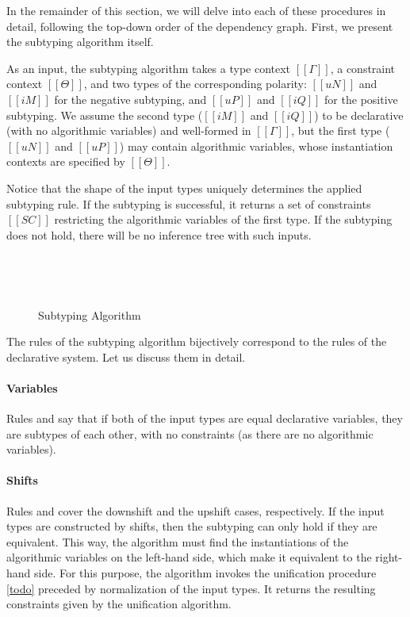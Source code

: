 In the remainder of this section, we will delve into each of these procedures in
detail, following the top-down order of the dependency graph. First, 
we present the subtyping algorithm itself.

As an input, the subtyping algorithm takes
a type context $[[Γ]]$, a constraint context $[[Θ]]$,
and two types of the corresponding polarity:
$[[uN]]$ and  $[[iM]]$ for the negative subtyping, and
$[[uP]]$ and  $[[iQ]]$ for the positive subtyping.
We assume the second type ($[[iM]]$ and $[[iQ]]$) to be 
declarative (with no algorithmic variables) and well-formed in $[[Γ]]$,
but the first type ($[[uN]]$ and $[[uP]]$) may contain algorithmic variables,
whose instantiation contexts are specified by $[[Θ]]$.

Notice that the shape of the input types uniquely determines the
applied subtyping rule.  If the subtyping is successful, it returns
a set of constraints $[[SC]]$ restricting the algorithmic 
variables of the first type. If the subtyping does not hold, 
there will be no inference tree with such inputs. 

\begin{figure}[h]
  \hfill\\
  \begin{multicols}{2}
    \ottdefnANsubLabeled{}
    \columnbreak\\
    \ottdefnAPsupLabeled{}
  \end{multicols}
  \caption{Subtyping Algorithm}
  \label{fig:alg-subtyping}
\end{figure}

The rules of the subtyping algorithm bijectively correspond to the rules of the declarative
system. Let us discuss them in detail.

\paragraph{Variables} Rules  and 
say that if both of the input types are equal declarative variables,
they are subtypes of each other, with no constraints (as there are no algorithmic variables).

\paragraph{Shifts} Rules  and
 cover the downshift and the upshift cases,
respectively. If the input types are constructed by shifts, then the subtyping
can only hold if they are equivalent. This way, the algorithm must find the
instantiations of the algorithmic variables on the left-hand side, which make it
equivalent to the right-hand side. For this purpose, the algorithm invokes the
unification procedure \cref{todo} preceded by normalization of the input types.
It returns the resulting constraints given by the unification algorithm. 

